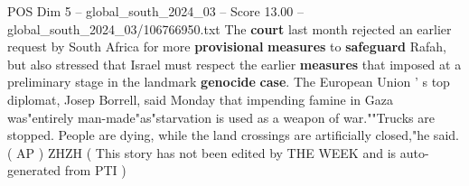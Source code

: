 \begin{textsample}{POS Dim 5 – global\_south\_2024\_03 – Score 13.00 – global\_south\_2024\_03/106766950.txt}
The \textbf{court} last month rejected an earlier request by South Africa for more \textbf{provisional} \textbf{measures} to \textbf{safeguard} Rafah, but also stressed that Israel must respect the earlier \textbf{measures} that imposed at a preliminary stage in the landmark \textbf{genocide} \textbf{case}.
The European Union ' s top diplomat, Josep Borrell, said Monday that impending famine in Gaza was"entirely man-made"as"starvation is used as a weapon of war.""Trucks are stopped.
People are dying, while the land crossings are artificially closed,"he said. ( AP ) ZHZH ( This story has not been edited by THE WEEK and is auto-generated from PTI )

\end{textsample}
